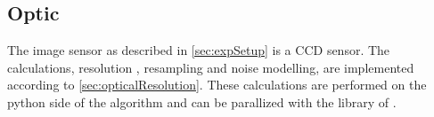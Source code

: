 \subsection{Optic}
\label{sec:ccdOptic}
% 
The image sensor as described in \cref{sec:expSetup} is a \ac{CCD} sensor.
The calculations, \ie resolution \dummy{}, resampling and noise modelling, are implemented according to \cref{sec:opticalResolution}.
These calculations are performed on the python side of the algorithm and can be parallized with the  library of \python{}.
% 
%
%

% 
% 
% 
